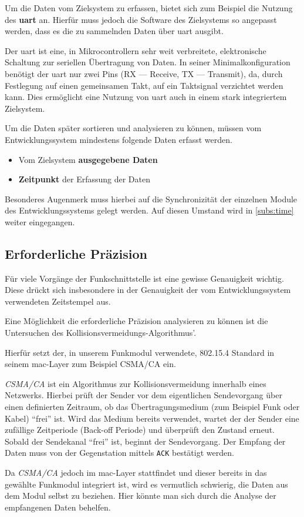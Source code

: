Um die Daten vom Zielsystem zu erfassen, bietet sich zum Beispiel die Nutzung
des \textbf{\gls{uart}} an. Hierfür muss jedoch die Software des Zielsystems so
angepasst werden, dass es die zu sammelnden Daten über \gls{uart} ausgibt.

\begin{definition}[UART]
Der \gls{uart} ist eine, in Mikrocontrollern sehr weit verbreitete,
elektronische Schaltung zur seriellen Übertragung von Daten. In
seiner Minimalkonfiguration benötigt der \gls{uart} nur zwei Pins (RX ---
Receive, TX --- Transmit), da, durch Festlegung auf einen gemeinsamen Takt, auf
ein Taktsignal verzichtet werden kann. Dies ermöglicht eine Nutzung von
\gls{uart} auch in einem stark integriertem Zielsystem.
\end{definition}

\begin{minipage}[c]{\textwidth}
Um die Daten später sortieren und analysieren zu können, müssen vom
Entwicklungssystem mindestens folgende Daten erfasst werden.
\begin{itemize}
  \item Vom Zielsystem \textbf{ausgegebene Daten}
  \item \textbf{Zeitpunkt} der Erfassung der Daten
\end{itemize}
\end{minipage}

Besonderes Augenmerk muss hierbei auf die Synchronizität der einzelnen Module
des Entwicklungssystems gelegt werden. Auf diesen Umstand wird in
\autoref{subs:time} weiter eingegangen. 

\subsection{Erforderliche Präzision}\label{subs:praezision}
Für viele Vorgänge der Funkschnittstelle ist eine gewisse Genauigkeit wichtig.
Diese drückt sich insbesondere in der Genauigkeit der vom Entwicklungssystem
verwendeten Zeitstempel aus.

Eine Möglichkeit die erforderliche Präzision analysieren zu können ist die
Untersuchen des Kollisionsvermeidungs-Algorithmus'.

Hierfür setzt der, in unserem Funkmodul verwendete, 802.15.4 Standard in seinem
\gls{mac}-Layer zum Beispiel CSMA/CA ein\cite{IEEE01}.
\begin{definition}[CSMA/CA]
\emph{CSMA/CA} ist ein Algorithmus zur Kollisionsvermeidung innerhalb eines
Netzwerks. Hierbei prüft der Sender vor dem eigentlichen Sendevorgang über
einen definierten Zeitraum, ob das Übertragungsmedium (zum Beispiel Funk oder
Kabel) "`frei"' ist. Wird das Medium bereits verwendet, wartet der der Sender
eine zufällige Zeitperiode (Back-off Periode) und überprüft den Zustand erneut.
Sobald der Sendekanal "`frei"' ist, beginnt der Sendevorgang. Der Empfang der Daten muss
von der Gegenstation mittels \texttt{ACK} bestätigt werden.
\end{definition}
Da \emph{CSMA/CA} jedoch im \gls{mac}-Layer stattfindet und dieser bereits
in das gewählte Funkmodul integriert ist, wird es vermutlich schwierig,
die Daten aus dem Modul selbst zu beziehen. Hier könnte man sich durch
die Analyse der empfangenen Daten behelfen.

